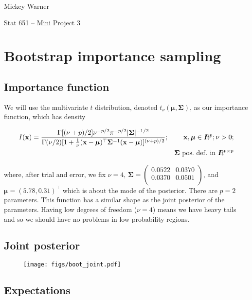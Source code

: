\documentclass[12pt]{article}
\newcommand{\m}[1]{\mathbf{\bm{#1}}}
\newcommand{\R}{I\hspace{-4.4pt}R}
\begin{document}
\noindent Mickey Warner

\noindent Stat 651 -- Mini Project 3

\section{Bootstrap importance sampling}

\subsection{Importance function}

\noindent We will use the multivariate $t$ distribution, denoted $t_\nu(\m{\mu}, \m{\Sigma})$, as our importance function, which has density

\begin{eqnarray*}
I(\m{x}) = \frac{\Gamma[(\nu+p)/2]\nu^{-p/2}\pi^{-p/2}|\m{\Sigma}|^{-1/2}}{\Gamma(\nu/2)[1+\frac{1}{\nu}(\m{x}-\m{\mu})^\top\m{\Sigma}^{-1}(\m{x}-\m{\mu})]^{(\nu+p)/2}}; && \m{x}, \m{\mu} \in \R^p; \nu>0; \\
&& \m{\Sigma}~\mathrm{pos.~def.~in~} \R^{p\times p}
\end{eqnarray*}

\noindent where, after trial and error, we fix $\nu = 4$, $\m{\Sigma} = \left(\begin{array}{ll} 0.0522 & 0.0370 \\ 0.0370 & 0.0501 \\ \end{array}\right)$, and $\m{\mu}=(5.78, 0.31)^\top$ which is about the mode of the posterior. There are $p=2$ parameters. This function has a similar shape as the joint posterior of the parameters. Having low degrees of freedom ($\nu=4$) means we have heavy tails and so we should have no problems in low probability regions.

\subsection{Joint posterior}

\begin{figure}[H]
    \centering
    \texttt{[image: figs/boot\_joint.pdf]}
    \caption*{}
\end{figure}

\subsection{Expectations}
\end{document}
